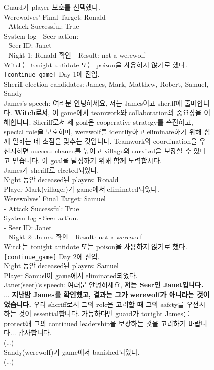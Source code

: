 \begin{figure}[htbp]
\centering
\begin{tcolorbox}[colback=green!2!white, colframe=gray!50!green]
\begin{minipage}{\linewidth}
\small

Guard가 player 보호를 선택했다.\\
Werewolves' Final Target: Ronald  \\
 - Attack Successful: True  \\
System log - Seer action:  \\
 - Seer ID: Janet  \\
 - Night 1: Ronald 확인 - Result: not a werewolf\\
Witch는 tonight antidote 또는 poison을 사용하지 않기로 했다.\\
\texttt{[continue\_game]} Day 1에 진입. \\
Sheriff election candidates: James, Mark, Matthew, Robert, Samuel, Sandy  \\
James's speech: 여러분 안녕하세요, 저는 James이고 sheriff에 출마합니다. \textbf{Witch로서}, 이 game에서 teamwork와 collaboration의 중요성을 이해합니다. Sheriff로서 제 goal은 cooperative strategy를 촉진하고, special role을 보호하며, werewolf를 identify하고 eliminate하기 위해 함께 일하는 데 초점을 맞추는 것입니다. Teamwork와 coordination을 우선시하면 success chance를 높이고 village의 survival을 보장할 수 있다고 믿습니다. 이 goal을 달성하기 위해 함께 노력합시다.  \\
James가 sheriff로 elected되었다.    \\

Night 동안 deceased된 players: Ronald  \\

Player Mark(villager)가 game에서 eliminated되었다. \\

Werewolves' Final Target: Samuel  \\
 - Attack Successful: True   \\
System log - Seer action:  \\
 - Seer ID: Janet  \\
 - Night 2: James 확인 - Result: not a werewolf  \\
Witch는 tonight antidote 또는 poison을 사용하지 않기로 했다.  \\

\texttt{[continue\_game]} Day 2에 진입.  \\
Night 동안 deceased된 players: Samuel  \\
Player Samuel이 game에서 eliminated되었다.\\
Janet(seer)'s speech: 여러분 안녕하세요, \textbf{저는 Seer인 Janet입니다.} ... \textbf{지난밤 James를 확인했고, 결과는 그가 werewolf가 아니라는 것이었습니다.} 우리 sheriff로서 그의 role을 고려할 때 그의 safety를 우선시하는 것이 essential합니다. 가능하다면 guard가 tonight James를 protect해 그의 continued leadership을 보장하는 것을 고려하기 바랍니다... 감사합니다.\\
(\ldots)  \\
Sandy(werewolf)가 game에서 banished되었다.  \\
(\ldots)


\end{minipage}
\end{tcolorbox}
\end{figure}
